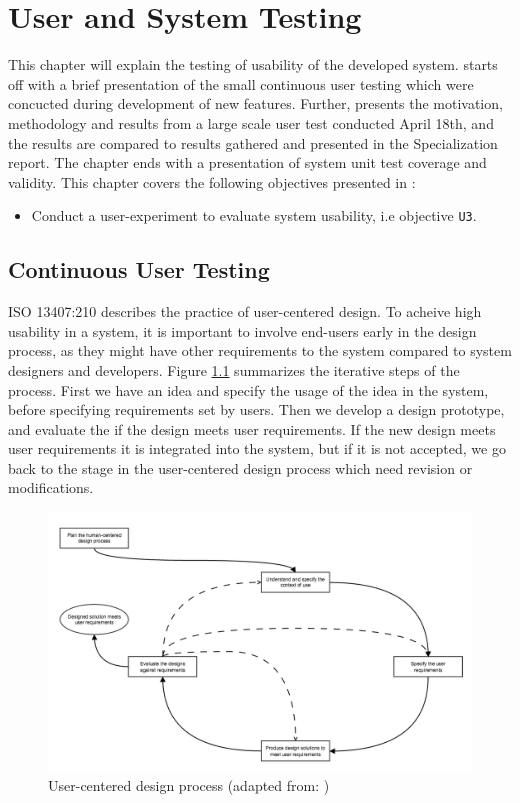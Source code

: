 \chapter{User and System Testing}
\label{ch:testing}
This chapter will explain the testing of usability of the developed system.  starts off with a brief presentation of the small continuous user testing which were concucted during development of new features. Further,  presents the motivation, methodology and results from a large scale user test conducted April 18th, and the results are compared to results gathered and presented in the Specialization report. The chapter ends with a presentation of system unit test coverage and validity. This chapter covers the following objectives presented in :
\begin{itemize}
  \item Conduct a user-experiment to evaluate system usability, i.e objective \texttt{U3}.
\end{itemize}

\section{Continuous User Testing}
\label{sec:cont-user-testing}
ISO 13407:210 \cite{iso1999HCD} describes the practice of user-centered design. To acheive high usability in a system, it is important to involve end-users early in the design process, as they might have other requirements to the system compared to system designers and developers. Figure \ref{fig:user-centered-design} summarizes the iterative steps of the process. First we have an idea and specify the usage of the idea in the system, before specifying requirements set by users. Then we develop a design prototype, and evaluate the if the design meets user requirements. If the new design meets user requirements it is integrated into the system, but if it is not accepted, we go back to the stage in the user-centered design process which need revision or modifications. \\

\begin{figure}
  \includegraphics[width=1.0\textwidth]{figs/iterative-design-process.png}
  \caption[User-centered design process]{User-centered design process (adapted from: \cite{iso1999HCD})}
  \label{fig:user-centered-design}
\end{figure}

